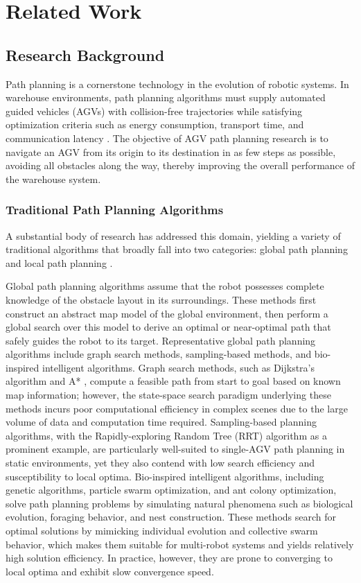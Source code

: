 \section{Related Work}

\subsection{Research Background}

Path planning is a cornerstone technology in the evolution of robotic systems. In warehouse environments, path planning algorithms must supply automated guided vehicles (AGVs) with collision-free trajectories while satisfying optimization criteria such as energy consumption, transport time, and communication latency \cite{ref1}. The objective of AGV path planning research is to navigate an AGV from its origin to its destination in as few steps as possible, avoiding all obstacles along the way, thereby improving the overall performance of the warehouse system.

\subsubsection{Traditional Path Planning Algorithms}

A substantial body of research has addressed this domain, yielding a variety of traditional algorithms that broadly fall into two categories: global path planning and local path planning \cite{ref2}.

Global path planning algorithms assume that the robot possesses complete knowledge of the obstacle layout in its surroundings. These methods first construct an abstract map model of the global environment, then perform a global search over this model \cite{ref3} to derive an optimal or near-optimal path that safely guides the robot to its target. Representative global path planning algorithms include graph search methods, sampling-based methods, and bio-inspired intelligent algorithms. Graph search methods, such as Dijkstra's algorithm \cite{ref4} and A* \cite{ref5}, compute a feasible path from start to goal based on known map information; however, the state-space search paradigm underlying these methods incurs poor computational efficiency in complex scenes due to the large volume of data and computation time required. Sampling-based planning algorithms, with the Rapidly-exploring Random Tree (RRT) algorithm as a prominent example, are particularly well-suited to single-AGV path planning in static environments, yet they also contend with low search efficiency and susceptibility to local optima. Bio-inspired intelligent algorithms, including genetic algorithms, particle swarm optimization, and ant colony optimization, solve path planning problems by simulating natural phenomena such as biological evolution, foraging behavior, and nest construction. These methods search for optimal solutions by mimicking individual evolution and collective swarm behavior, which makes them suitable for multi-robot systems and yields relatively high solution efficiency. In practice, however, they are prone to converging to local optima and exhibit slow convergence speed.

